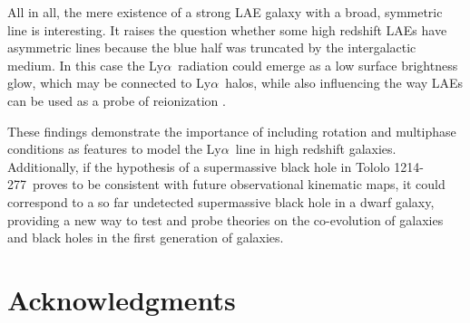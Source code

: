 \documentclass[a4,useAMS,usenatbib,usegraphicx]{mn2e}
\newcommand{\tol}{Tololo 1214-277}
\newcommand{\lya}{Ly$\alpha$}
\begin{document}
All in all, the mere existence of a strong LAE galaxy with a broad,
symmetric line is interesting.
It raises the question whether some high redshift LAEs have asymmetric
lines because the blue half was truncated by the intergalactic medium.
In this case the \lya\ radiation could emerge as a low surface
brightness glow, which may be connected to \lya\ halos, while also
influencing the way LAEs can be used as a probe of reionization
\citep{2014PASA...31...40D}.  

These findings demonstrate the importance of including rotation and multiphase
conditions as features to model the \lya\ line in high redshift
galaxies.
Additionally, if the hypothesis of a supermassive black
hole in \tol\ proves to be consistent with future observational
kinematic maps, it could correspond to a so far undetected
supermassive black hole in a dwarf galaxy, providing a new way to test
and probe theories on the co-evolution of galaxies and black holes in
the first generation of galaxies.   



\section*{Acknowledgments}



\end{document}
